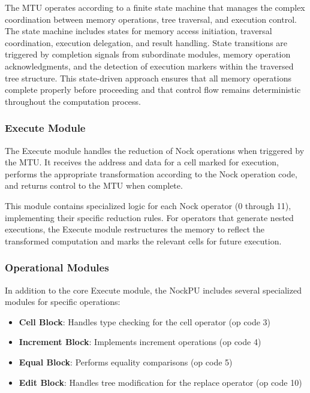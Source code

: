 \documentclass[twoside]{article}
\begin{document}
\noindent
The MTU operates according to a finite state machine that manages the complex coordination between memory operations, tree traversal, and execution control. The state machine includes states for memory access initiation, traversal coordination, execution delegation, and result handling. State transitions are triggered by completion signals from subordinate modules, memory operation acknowledgments, and the detection of execution markers within the traversed tree structure. This state-driven approach ensures that all memory operations complete properly before proceeding and that control flow remains deterministic throughout the computation process.

\subsubsection{Execute Module}

The Execute module handles the reduction of Nock operations when triggered by the MTU. It receives the address and data for a cell marked for execution, performs the appropriate transformation according to the Nock operation code, and returns control to the MTU when complete.

This module contains specialized logic for each Nock operator (0 through 11), implementing their specific reduction rules. For operators that generate nested executions, the Execute module restructures the memory to reflect the transformed computation and marks the relevant cells for future execution.

\subsubsection{Operational Modules}

In addition to the core Execute module, the NockPU includes several specialized modules for specific operations:

\begin{itemize}
  \item \textbf{Cell Block}: Handles type checking for the cell operator (op code 3)
  \item \textbf{Increment Block}: Implements increment operations (op code 4)
  \item \textbf{Equal Block}: Performs equality comparisons (op code 5)
  \item \textbf{Edit Block}: Handles tree modification for the replace operator (op code 10)
\end{itemize}
\end{document}
